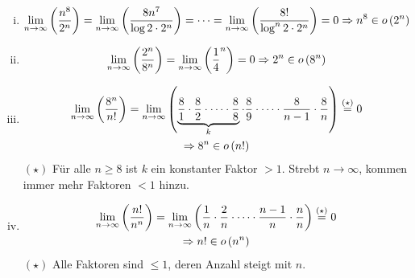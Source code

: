 \documentclass[a4paper]{scrartcl}
\begin{document}
\begin{enumerate}[(a)]
\begin{enumerate}[i.]
            \item
                \begin{equation*}
                    \lim_{n \to \infty} \left( \frac{n^8}{2^n} \right)
                    = \lim_{n \to \infty} \left( \frac{8n^7}{\log 2 \cdot 2^n} \right)
                    = \cdots
                    = \lim_{n \to \infty} \left( \frac{8!}{\log^n 2 \cdot 2^n} \right)
                    = 0
                    \Rightarrow n^8 \in o \left( 2^n \right)
                \end{equation*}

            \item
                \begin{equation*}
                    \lim_{n \to \infty} \left( \frac{2^n}{8^n} \right)
                    = \lim_{n \to \infty} \left( \frac{1}{4}^n \right)
                    = 0
                    \Rightarrow 2^n \in o \left( 8^n \right)
                \end{equation*}

            \item
                \begin{equation*}
                    \begin{gathered}
                        \lim_{n \to \infty} \left( \frac{8^n}{n!} \right)
                        = \lim_{n \to \infty} \left( \underbrace{\frac{8}{1} \cdot \frac{8}{2} \cdot \cdots \cdot \frac{8}{8}}_{k} \cdot \frac{8}{9} \cdot \cdots \cdot \frac{8}{n-1} \cdot \frac{8}{n} \right)
                        \stackrel{(\star)}{=} 0 \\
                        \Rightarrow 8^n \in o \left( n! \right)
                    \end{gathered}
                \end{equation*}
                $(\star)$ Für alle $n \geq 8$ ist $k$ ein konstanter Faktor $> 1$.
                Strebt $n \to \infty$, kommen immer mehr Faktoren $< 1$ hinzu.
                

            \item
                \begin{equation*}
                    \begin{gathered}
                        \lim_{n \to \infty} \left( \frac{n!}{n^n} \right)
                        = \lim_{n \to \infty} \left( \frac{1}{n} \cdot \frac{2}{n} \cdot \cdots \cdot \frac{n-1}{n} \cdot \frac{n}{n} \right)
                            \stackrel{(\star)}{=} 0 \\
                            \Rightarrow n! \in o \left( n^n \right)
                        \end{gathered}
                \end{equation*}
                $(\star)$ Alle Faktoren sind $\leq 1$, deren Anzahl steigt mit
                $n$.


\end{enumerate}
\end{enumerate}
\end{document}
